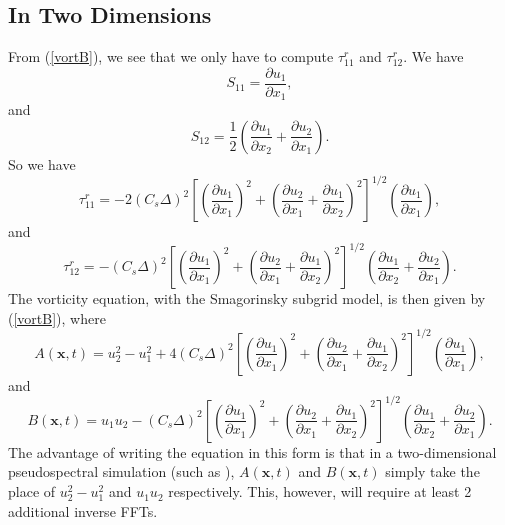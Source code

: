 \documentclass[11pt,a4paper]{article}
\newcommand{\eq}[1]{(\ref{#1})}
\begin{document}
\subsection{In Two Dimensions}
From \eq{vortB}, we see that we only have to compute $\tau^r_{11}$ and $\tau^r_{12}$. We have 
$${S}_{11} = \frac{\partial {u}_1}{\partial x_1},$$
and
$${S}_{12} = \frac{1}{2}\left( \frac{\partial {u}_1}{\partial x_2} + \frac{\partial {u}_2}{\partial x_1}\right).$$
So we have
\begin{equation}\label{tau11}
\tau_{11}^r= -2(C_s \Delta)^2\left[\left( \frac{\partial {u}_1}{\partial x_1}\right)^2+\left( \frac{\partial {u}_2}{\partial x_1} + \frac{\partial {u}_1}{\partial x_2}\right)^2 \right]^{1/2}\left(\frac{\partial {u}_1}{\partial x_1}\right),
\end{equation}
and
\begin{equation}\label{tau12}
\tau_{12}^r= -(C_s \Delta)^2\left[\left( \frac{\partial {u}_1}{\partial x_1}\right)^2+\left( \frac{\partial {u}_2}{\partial x_1} + \frac{\partial {u}_1}{\partial x_2}\right)^2 \right]^{1/2}\left( \frac{\partial {u}_1}{\partial x_2} + \frac{\partial {u}_2}{\partial x_1}\right).
\end{equation}
The vorticity equation, with the Smagorinsky subgrid model, is then given by \eq{vortB}, where
$$A(\boldsymbol{x}, t) = u_2^2 - u_1^2 + 4(C_s \Delta)^2\left[\left( \frac{\partial {u}_1}{\partial x_1}\right)^2+\left( \frac{\partial {u}_2}{\partial x_1} + \frac{\partial {u}_1}{\partial x_2}\right)^2 \right]^{1/2}\left(\frac{\partial {u}_1}{\partial x_1}\right),$$
and
$$B(\boldsymbol{x}, t) = u_1u_2 -(C_s \Delta)^2\left[\left( \frac{\partial {u}_1}{\partial x_1}\right)^2+\left( \frac{\partial {u}_2}{\partial x_1} + \frac{\partial {u}_1}{\partial x_2}\right)^2 \right]^{1/2}\left( \frac{\partial {u}_1}{\partial x_2} + \frac{\partial {u}_2}{\partial x_1}\right).$$
The advantage of writing the equation in this form is that in a two-dimensional pseudospectral simulation (such as ), $A(\boldsymbol{x},t)$ and $B(\boldsymbol{x},t)$ simply take the place of $u_2^2 - u_1^2$ and $u_1u_2$ respectively. This, however, will require at least 2 additional inverse FFTs.

\clearpage

\end{document}
